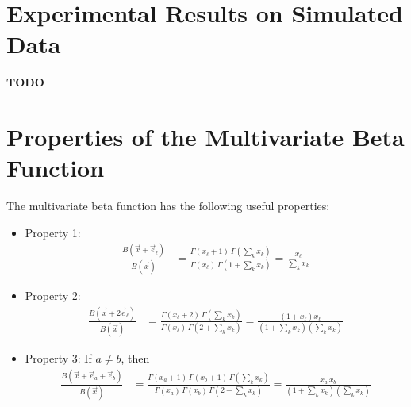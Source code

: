 \documentclass{article}
\theoremstyle{definition}
\begin{document}
\section{Experimental Results on Simulated Data}

{\bf TODO}

\clearpage
\appendix
\section{Properties of the Multivariate Beta Function}

The multivariate beta function has the following useful properties:

\begin{itemize}

\item Property 1:
\begin{align*}
\frac{B(\vec x + \vec e_\ell)}{B(\vec x)}
&= \frac{\Gamma(x_\ell + 1) \, \Gamma(\sum_k x_k)}
        {\Gamma(x_\ell) \, \Gamma(1 + \sum_k x_k)}
= \frac{x_\ell}{\sum_k x_k}
\end{align*}

\item Property 2:
\begin{align*}
\frac{B(\vec x + 2\vec e_\ell)}{B(\vec x)}
&= \frac{\Gamma(x_\ell + 2) \, \Gamma(\sum_k x_k)}
        {\Gamma(x_\ell) \, \Gamma(2 + \sum_k x_k)}
= \frac{(1 + x_\ell) x_\ell}{(1 + \sum_k x_k) (\sum_k x_k)}
\end{align*}

\item Property 3:
If $a \neq b$, then
\begin{align*}
\frac{B(\vec x + \vec e_a + \vec e_b)}{B(\vec x)}
&= \frac{\Gamma(x_a + 1) \, \Gamma(x_b + 1) \, \Gamma(\sum_k x_k)}
        {\Gamma(x_a) \, \Gamma(x_b) \, \Gamma(2 + \sum_k x_k)}
= \frac{x_a \, x_b}{(1 + \sum_k x_k) (\sum_k x_k)}
\end{align*}

\end{itemize}
\end{document}
